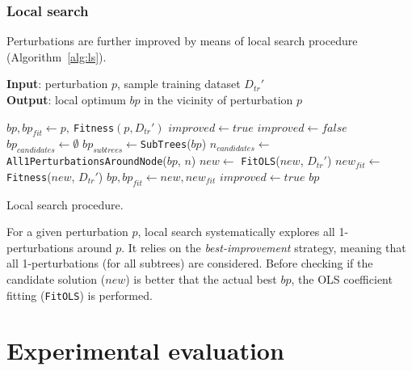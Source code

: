 \documentclass[a4paper,12pt]{elsarticle}
\begin{document}

\subsubsection{Local search}\label{sec:ls}

Perturbations are further improved by means of local search procedure (Algorithm~\ref{alg:ls}). 

\begin{algorithm}
	\hspace*{\algorithmicindent} \textbf{Input}: perturbation $p$, sample training dataset $D_{tr}'$ \\
	\hspace*{\algorithmicindent} \textbf{Output}: local optimum $bp$ in the vicinity of perturbation $p$
	\begin{algorithmic}[1] 
		\State $bp, bp_{fit} \gets p,\ $\texttt{Fitness}$(p,D_{tr}')$ 
		\State $improved \gets true$
		\State $improved \gets false$
		\State $bp_{candidates} \gets \emptyset$
		\State $bp_{subtrees} \gets $\texttt{SubTrees}($bp$)
		\State $n_{candidates} \gets $ \texttt{All1PerturbationsAroundNode}($bp$, $n$)
		\State $new \gets$ \texttt{FitOLS}($new$, $D_{tr}'$)
		\State $new_{fit} \gets$ \texttt{Fitness}($new$, $D_{tr}'$)
		\State $bp, bp_{fit} \gets new, new_{fit}$
		\State $improved \gets true$
		\EndIf
		\EndFor
		\EndFor
		\EndWhile
		\State \Return $bp$
		\EndProcedure
	\end{algorithmic}
	\caption{Local search procedure.}
	\label{alg:ls}
\end{algorithm}  

For a given perturbation $p$, local search systematically explores all 1-perturbations around $p$. It relies on the \emph{best-improvement} strategy, meaning that all 1-perturbations (for all subtrees) are considered. Before checking if the candidate solution ($new$) is better that the actual best $bp$, the OLS coefficient fitting (\texttt{FitOLS}) is performed.  


\section{Experimental evaluation}\label{sec:experiments}
\end{document}

